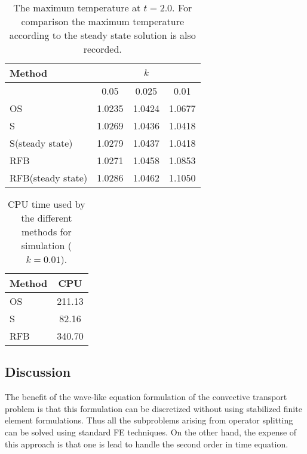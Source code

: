 \begin{table}  
\caption{The maximum temperature at $t=2.0$. For comparison 
the maximum temperature according to the steady state solution is also 
recorded.}
\label{methodvstemperature}
\begin{center}
\begin{tabular}{lccc}\hline
Method            &        &  $k$   &                \\ \hline
                  & 0.05   & 0.025  & 0.01           \\ \hline
OS                & 1.0235 & 1.0424 & 1.0677         \\
S                 & 1.0269 & 1.0436 & 1.0418         \\
S(steady state)   & 1.0279 & 1.0437 & 1.0418         \\
RFB               & 1.0271 & 1.0458 & 1.0853         \\
RFB(steady state) & 1.0286 & 1.0462 & 1.1050         \\ \hline
\end{tabular}
\end{center}
\end{table}

\begin{table} 
\caption{CPU time used by the different methods for simulation ($k=0.01$).}
\label{methodvscpu}
\begin{center}
\begin{tabular}{lc}\hline
Method            & CPU     \\ \hline
OS                & 211.13  \\
S                 & 82.16   \\
RFB               & 340.70  \\ \hline
\end{tabular}
\end{center}
\end{table}


\subsection*{Discussion}

The benefit of the wave-like equation formulation of the convective 
transport problem is that this formulation can be discretized without
using stabilized finite element formulations. Thus all the subproblems
arising from operator splitting can be solved using standard FE
techniques. On the other hand,
the expense of this approach is that one is lead to handle the second
order in time equation. 

